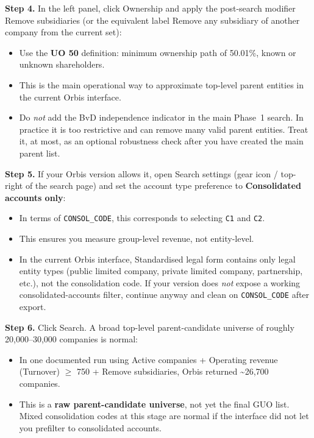 \documentclass[11pt,a4paper]{article}
\newcommand{\field}[1]{\texttt{#1}}
\newcommand{\menu}[1]{\textsf{#1}}
\newcommand{\step}[1]{\noindent\textbf{Step #1.}\quad}
\begin{document}
\step{4} In the left panel, click \menu{Ownership} and apply the post-search modifier \menu{Remove subsidiaries} (or the equivalent label \menu{Remove any subsidiary of another company from the current set}):
\begin{itemize}[noitemsep]
  \item Use the \textbf{UO 50} definition: minimum ownership path of 50.01\%, known or unknown shareholders.
  \item This is the main operational way to approximate top-level parent entities in the current Orbis interface.
  \item Do \emph{not} add the \menu{BvD independence indicator} in the main Phase~1 search. In practice it is too restrictive and can remove many valid parent entities. Treat it, at most, as an optional robustness check after you have created the main parent list.
\end{itemize}

\step{5} If your Orbis version allows it, open \menu{Search settings} (gear icon / top-right of the search page) and set the account type preference to \textbf{Consolidated accounts only}:
\begin{itemize}[noitemsep]
  \item In terms of \field{CONSOL\_CODE}, this corresponds to selecting \field{C1} and \field{C2}.
  \item This ensures you measure group-level revenue, not entity-level.
  \item In the current Orbis interface, \menu{Standardised legal form} contains only legal entity types (public limited company, private limited company, partnership, etc.), not the consolidation code. If your version does \emph{not} expose a working consolidated-accounts filter, continue anyway and clean on \field{CONSOL\_CODE} after export.
\end{itemize}

\step{6} Click \menu{Search}. A broad top-level parent-candidate universe of roughly 20,000--30,000 companies is normal:
\begin{itemize}[noitemsep]
  \item In one documented run using \menu{Active companies} + \menu{Operating revenue (Turnover)} $\geq$ 750 + \menu{Remove subsidiaries}, Orbis returned \textasciitilde26,700 companies.
  \item This is a \textbf{raw parent-candidate universe}, not yet the final GUO list. Mixed consolidation codes at this stage are normal if the interface did not let you prefilter to consolidated accounts.
\end{itemize}
\end{document}
